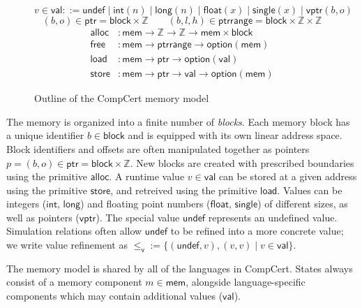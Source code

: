 \documentclass[11pt,oneside,draft]{book}
\theoremstyle{definition}
\newcommand{\kw}[1]{\ensuremath{ \mathsf{#1} }}
\newcommand{\vref}{\le_\kw{v}}   %
\newcommand{\figsize}{}
\begin{document}
\begin{figure} %
  \figsize
  \[
    v \in \kw{val} ::=
          \kw{undef} \mid
          \kw{int}(n) \mid
          \kw{long}(n) \mid
          \kw{float}(x) \mid
          \kw{single}(x) \mid
          \kw{vptr}(b, o)
  \]
  \[
    (b, o) \in \kw{ptr} =
      \kw{block} \times \mathbb{Z}
    \qquad
    (b, l, h) \in \kw{ptrrange} =
      \kw{block} \times \mathbb{Z} \times \mathbb{Z}
  \]
  \begin{align*}
    \kw{alloc} &:
      \kw{mem} \rightarrow \mathbb{Z} \rightarrow \mathbb{Z} \rightarrow
      \kw{mem} \times \kw{block}
    \\
    \kw{free} &:
      \kw{mem} \rightarrow
      \kw{ptrrange} \rightarrow
      \kw{option}(\kw{mem})
    \\
    \kw{load} &:
      \kw{mem} \rightarrow \kw{ptr} \rightarrow \kw{option}(\kw{val})
    \\
    \kw{store} &:
      \kw{mem} \rightarrow \kw{ptr} \rightarrow \kw{val} \rightarrow \kw{option}(\kw{mem})
  \end{align*}
  \caption{Outline of the CompCert memory model}
  \label{fig:mm}
\end{figure}

The memory is organized into a finite number of \emph{blocks}.
Each memory block has a unique identifier $b \in \kw{block}$
and is equipped with its own linear address space.
Block identifiers and offsets are often manipulated together
as pointers $p = (b, o) \in \kw{ptr} = \kw{block} \times \mathbb{Z}$.
New blocks are created with prescribed boundaries
using the primitive $\kw{alloc}$.
A runtime value $v \in \kw{val}$ can be stored at
a given address using the primitive \kw{store},
and retreived using the primitive \kw{load}.
Values can be integers (\kw{int}, \kw{long}) and
floating point numbers (\kw{float}, \kw{single})
of different sizes,
as well as pointers (\kw{vptr}).
The special value \kw{undef}
represents an undefined value.
Simulation relations
often allow $\kw{undef}$
to be refined into a more concrete value;
we write value refinement as
${\vref} := \{(\kw{undef}, v), (v, v) \mid v \in \kw{val}\}$.

The memory model is shared by all of the languages in CompCert.
States always consist of
a memory component $m \in \kw{mem}$,
alongside language-specific components
which may contain additional values ($\kw{val}$).
\end{document}
